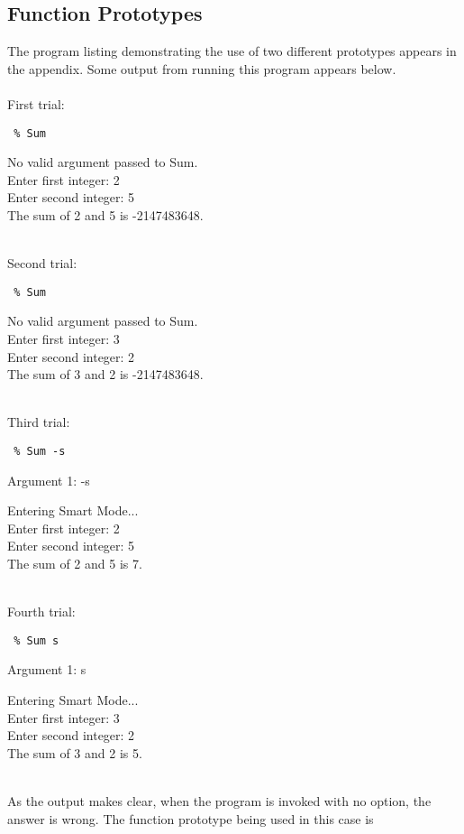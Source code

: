 \documentclass{article}
\begin{document}
\subsection{Function Prototypes}
\label{sec:sum}
The program listing demonstrating the use of two different
prototypes appears in the appendix.  Some output from 
running this program appears below.\\\\
First trial:\\

{\tt
\% Sum 

No valid argument passed to Sum.\\

Enter first integer: 2\\

Enter second integer: 5\\

The sum of 2 and 5 is -2147483648.\\
}
\\
Second trial:\\

{\tt
\% Sum

No valid argument passed to Sum.\\
 
Enter first integer: 3\\
 
Enter second integer: 2\\
 
The sum of 3 and 2 is -2147483648.\\
}
\\
Third trial:\\

{\tt
\% Sum -s

Argument 1: -s

Entering Smart Mode...\\
 
Enter first integer: 2\\
 
Enter second integer: 5\\
 
The sum of 2 and 5 is 7.\\
}
\\
Fourth trial:\\

{\tt
\% Sum s

Argument 1: s

Entering Smart Mode...\\
 
Enter first integer: 3\\
 
Enter second integer: 2\\
 
The sum of 3 and 2 is 5.\\
}
\\
As the output makes clear, when the program is invoked with no option,
the answer is wrong.  The function prototype being used in this case
is\\
\end{document}
